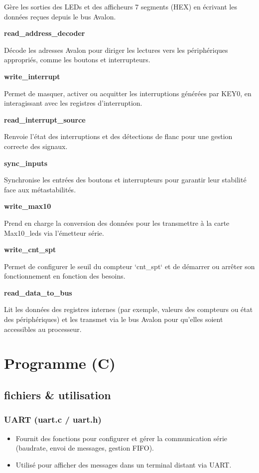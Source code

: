\documentclass[a4paper,12pt]{article}
\begin{document}
Gère les sorties des LEDs et des afficheurs 7 segments (HEX) en écrivant les données reçues depuis le bus Avalon.

\textbf{read\_address\_decoder}

Décode les adresses Avalon pour diriger les lectures vers les périphériques appropriés, comme les boutons et interrupteurs.

\textbf{write\_interrupt}

Permet de masquer, activer ou acquitter les interruptions générées par KEY0, en interagissant avec les registres d'interruption.

\textbf{read\_interrupt\_source}

Renvoie l'état des interruptions et des détections de flanc pour une gestion correcte des signaux.

\break

\textbf{sync\_inputs}

Synchronise les entrées des boutons et interrupteurs pour garantir leur stabilité face aux métastabilités.

\textbf{write\_max10}

Prend en charge la conversion des données pour les transmettre à la carte Max10\_leds via l'émetteur série.

\textbf{write\_cnt\_spt}

Permet de configurer le seuil du compteur `cnt\_spt` et de démarrer ou arrêter son fonctionnement en fonction des besoins.

\textbf{read\_data\_to\_bus}

Lit les données des registres internes (par exemple, valeurs des compteurs ou état des périphériques) et les transmet via le bus Avalon pour qu'elles soient accessibles au processeur.

\break

\section{Programme (C)}

\subsection{fichiers \& utilisation}

\subsubsection{UART (uart.c / uart.h)}

\begin{itemize}
    \item Fournit des fonctions pour configurer et gérer la communication série (baudrate, envoi de messages, gestion FIFO).
    \item Utilisé pour afficher des messages dans un terminal distant via UART.
\end{itemize}
\end{document}
